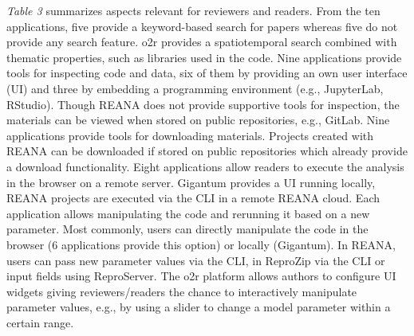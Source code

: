 \documentclass[onecolumn]{article}
\begin{document}
\emph{Table 3} summarizes aspects relevant for reviewers and readers.
From the ten applications, five provide a keyword-based search for
papers whereas five do not provide any search feature. o2r provides a
spatiotemporal search combined with thematic properties, such as
libraries used in the code. Nine applications provide tools for
inspecting code and data, six of them by providing an own user interface
(UI) and three by embedding a programming environment (e.g., JupyterLab,
RStudio). Though REANA does not provide supportive tools for inspection,
the materials can be viewed when stored on public repositories, e.g.,
GitLab. Nine applications provide tools for downloading materials.
Projects created with REANA can be downloaded if stored on public
repositories which already provide a download functionality. Eight
applications allow readers to execute the analysis in the browser on a
remote server. Gigantum provides a UI running locally, REANA projects
are executed via the CLI in a remote REANA cloud. Each application
allows manipulating the code and rerunning it based on a new parameter.
Most commonly, users can directly manipulate the code in the browser (6
applications provide this option) or locally (Gigantum). In REANA, users
can pass new parameter values via the CLI, in ReproZip via the CLI or
input fields using ReproServer. The o2r platform allows authors to
configure UI widgets giving reviewers/readers the chance to
interactively manipulate parameter values, e.g., by using a slider to
change a model parameter within a certain range.
\end{document}
